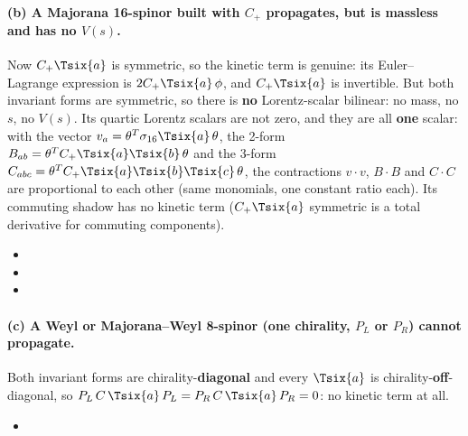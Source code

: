 \paragraph{(b) A Majorana 16-spinor built with $C_+$ propagates, but is massless and has no $V(s)$.}
Now $C_+\Tsix{a}$ is symmetric, so the kinetic term is genuine: its Euler--Lagrange expression is
$2C_+\Tsix{a}\,\phi$, and $C_+\Tsix{a}$ is invertible. But both invariant forms are symmetric, so
there is \textbf{no} Lorentz-scalar bilinear: no mass, no $s$, no $V(s)$. Its quartic Lorentz
scalars are not zero, and they are all \textbf{one} scalar: with the vector
$v_a=\theta^{T}\sigma_{16}\Tsix{a}\,\theta$, the 2-form $B_{ab}=\theta^{T}C_+\Tsix{a}\Tsix{b}\,\theta$
and the 3-form $C_{abc}=\theta^{T}C_+\Tsix{a}\Tsix{b}\Tsix{c}\,\theta$, the contractions $v\cdot v$,
$B\cdot B$ and $C\cdot C$ are proportional to each other (same monomials, one constant ratio each).
Its commuting shadow has no kinetic term ($C_+\Tsix{a}$ symmetric is a total derivative for
commuting components). 
\begin{itemize}
  \item {}
  \item {}
  \item {}
\end{itemize}

\paragraph{(c) A Weyl or Majorana--Weyl 8-spinor (one chirality, $P_L$ or $P_R$) cannot propagate.}
Both invariant forms are chirality-\textbf{diagonal} and every $\Tsix{a}$ is
chirality-\textbf{off}-diagonal, so $P_L\,C\,\Tsix{a}\,P_L=P_R\,C\,\Tsix{a}\,P_R=0$: no kinetic term
at all. 
\begin{itemize}
  \item {}
\end{itemize}

